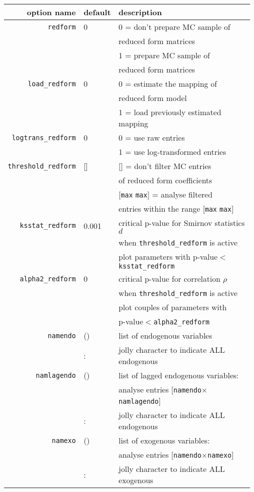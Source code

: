 \documentclass[12pt,a4paper]{article}
\begin{document}
\begin{tabular}{r|l|l}
                option name & default & description  \\ \hline
              \verb"redform"& 0& 0 = don't prepare MC sample of \\
                            &  & reduced form matrices \\
                            &  & 1 = prepare MC sample of \\
                            &  & reduced form matrices \\
         \verb"load_redform"& 0& 0 = estimate the mapping of \\
                            &  & reduced form model\\
                            &  & 1 = load previously estimated mapping\\
     \verb"logtrans_redform"& 0& 0 = use raw entries\\
                            &  & 1 = use log-transformed entries \\
    \verb"threshold_redform"& []& [] = don't filter MC entries \\
                            &   & of reduced form coefficients\\
                            &   & [\verb"max" \verb"max"] =  analyse filtered \\
                            &   & entries within the range [\verb"max" \verb"max"] \\
       \verb"ksstat_redform"& 0.001& critical p-value for Smirnov statistics $d$ \\
                            &   & when \verb"threshold_redform" is active\\
                            &   & plot parameters with p-value$<$\verb"ksstat_redform"\\
       \verb"alpha2_redform"& 0& critical p-value for correlation $\rho$ \\
                            &   & when \verb"threshold_redform" is active\\
                            &    & plot couples of parameters with \\
                            &   & p-value$<$\verb"alpha2_redform"\\
              \verb"namendo"& () & list of endogenous variables \\
                            & : & jolly character to indicate ALL endogenous \\
           \verb"namlagendo"& () & list of lagged endogenous variables:\\
                            &   & analyse entries [\verb"namendo"$\times$\verb"namlagendo"]\\
                            & : & jolly character to indicate ALL endogenous \\
               \verb"namexo"& ()& list of exogenous variables:\\
                            &   & analyse entries
                            [\verb"namendo"$\times$\verb"namexo"]\\
                            & : & jolly character to indicate ALL exogenous  \\\hline
\end{tabular}
\end{document}
